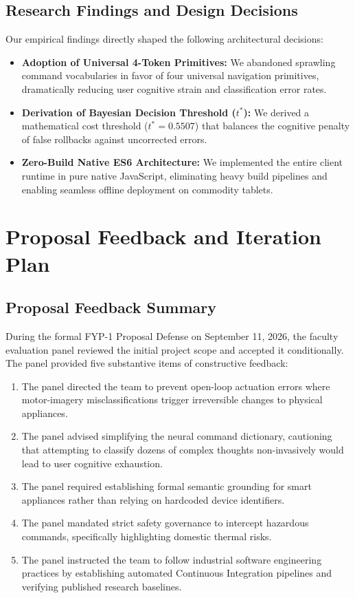 \documentclass[12pt,a4paper]{report}
\begin{document}
\section{Research Findings and Design Decisions}
Our empirical findings directly shaped the following architectural decisions:
\begin{itemize}[leftmargin=1.5em]
    \item \textbf{Adoption of Universal 4-Token Primitives:} We abandoned sprawling command vocabularies in favor of four universal navigation primitives, dramatically reducing user cognitive strain and classification error rates.
    \item \textbf{Derivation of Bayesian Decision Threshold ($t^*$):} We derived a mathematical cost threshold ($t^* = 0.5507$) that balances the cognitive penalty of false rollbacks against uncorrected errors.
    \item \textbf{Zero-Build Native ES6 Architecture:} We implemented the entire client runtime in pure native JavaScript, eliminating heavy build pipelines and enabling seamless offline deployment on commodity tablets.
\end{itemize}

\chapter{Proposal Feedback and Iteration Plan}

\section{Proposal Feedback Summary}
During the formal FYP-1 Proposal Defense on September 11, 2026, the faculty evaluation panel reviewed the initial project scope and accepted it conditionally. The panel provided five substantive items of constructive feedback:
\begin{enumerate}[leftmargin=1.5em]
    \item The panel directed the team to prevent open-loop actuation errors where motor-imagery misclassifications trigger irreversible changes to physical appliances.
    \item The panel advised simplifying the neural command dictionary, cautioning that attempting to classify dozens of complex thoughts non-invasively would lead to user cognitive exhaustion.
    \item The panel required establishing formal semantic grounding for smart appliances rather than relying on hardcoded device identifiers.
    \item The panel mandated strict safety governance to intercept hazardous commands, specifically highlighting domestic thermal risks.
    \item The panel instructed the team to follow industrial software engineering practices by establishing automated Continuous Integration pipelines and verifying published research baselines.
\end{enumerate}
\end{document}
